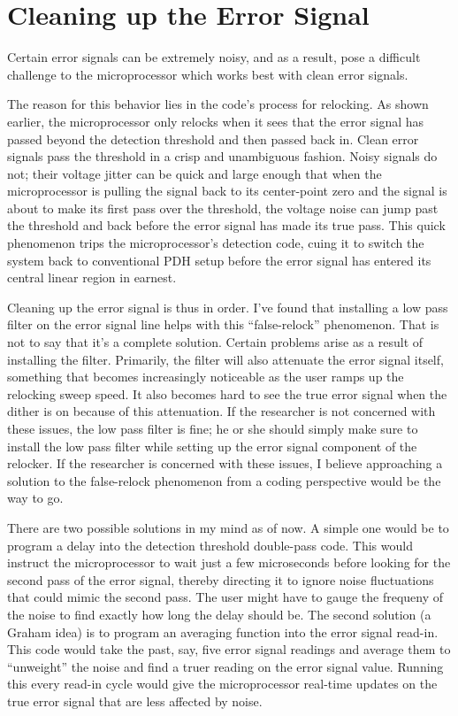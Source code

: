\documentclass[10pt]{report}
\begin{document}
\section{Cleaning up the Error Signal}
\label{sec:cleaningUpTheErrorSignal}

Certain error signals can be extremely noisy, and as a result, pose a difficult challenge to the microprocessor which works best with clean error signals. 

The reason for this behavior lies in the code's process for relocking. As shown earlier, the microprocessor only relocks when it sees that the error signal has passed beyond the detection threshold and then passed back in. Clean error signals pass the threshold in a crisp and unambiguous fashion. Noisy signals do not; their voltage jitter can be quick and large enough that when the microprocessor is pulling the signal back to its center-point zero and the signal is about to make its first pass over the threshold, the voltage noise can jump past the threshold and back before the error signal has made its true pass. This quick phenomenon trips the microprocessor's detection code, cuing it to switch the system back to conventional PDH setup before the error signal has entered its central linear region in earnest.

Cleaning up the error signal is thus in order. I've found that installing a low pass filter on the error signal line helps with this ``false-relock'' phenomenon. That is not to say that it's a complete solution. Certain problems arise as a result of installing the filter. Primarily, the filter will also attenuate the error signal itself, something that becomes increasingly noticeable as the user ramps up the relocking sweep speed. It also becomes hard to see the true error signal when the dither is on because of this attenuation. If the researcher is not concerned with these issues, the low pass filter is fine; he or she should simply make sure to install the low pass filter while setting up the error signal component of the relocker. If the researcher is concerned with these issues, I believe approaching a solution to the false-relock phenomenon from a coding perspective would be the way to go.

There are two possible solutions in my mind as of now. A simple one would be to program a delay into the detection threshold double-pass code. This would instruct the microprocessor to wait just a few microseconds before looking for the second pass of the error signal, thereby directing it to ignore noise fluctuations that could mimic the second pass. The user might have to gauge the frequeny of the noise to find exactly how long the delay should be. The second solution (a Graham idea) is to program an averaging function into the error signal read-in. This code would take the past, say, five error signal readings and average them to ``unweight'' the noise and find a truer reading on the error signal value. Running this every read-in cycle would give the microprocessor real-time updates on the true error signal that are less affected by noise.
\end{document}
